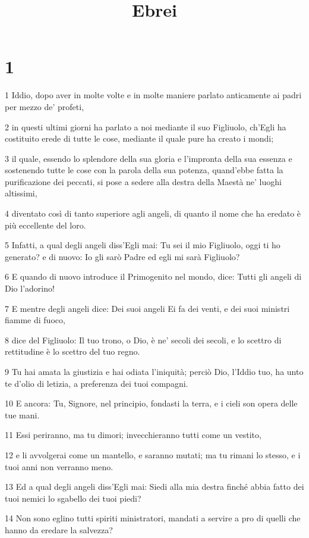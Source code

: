 

\title{Ebrei}


\chapter{1}

\par 1 Iddio, dopo aver in molte volte e in molte maniere parlato anticamente ai padri per mezzo de' profeti,
\par 2 in questi ultimi giorni ha parlato a noi mediante il suo Figliuolo, ch'Egli ha costituito erede di tutte le cose, mediante il quale pure ha creato i mondi;
\par 3 il quale, essendo lo splendore della sua gloria e l'impronta della sua essenza e sostenendo tutte le cose con la parola della sua potenza, quand'ebbe fatta la purificazione dei peccati, si pose a sedere alla destra della Maestà ne' luoghi altissimi,
\par 4 diventato così di tanto superiore agli angeli, di quanto il nome che ha eredato è più eccellente del loro.
\par 5 Infatti, a qual degli angeli diss'Egli mai: Tu sei il mio Figliuolo, oggi ti ho generato? e di nuovo: Io gli sarò Padre ed egli mi sarà Figliuolo?
\par 6 E quando di nuovo introduce il Primogenito nel mondo, dice: Tutti gli angeli di Dio l'adorino!
\par 7 E mentre degli angeli dice: Dei suoi angeli Ei fa dei venti, e dei suoi ministri fiamme di fuoco,
\par 8 dice del Figliuolo: Il tuo trono, o Dio, è ne' secoli dei secoli, e lo scettro di rettitudine è lo scettro del tuo regno.
\par 9 Tu hai amata la giustizia e hai odiata l'iniquità; perciò Dio, l'Iddio tuo, ha unto te d'olio di letizia, a preferenza dei tuoi compagni.
\par 10 E ancora: Tu, Signore, nel principio, fondasti la terra, e i cieli son opera delle tue mani.
\par 11 Essi periranno, ma tu dimori; invecchieranno tutti come un vestito,
\par 12 e li avvolgerai come un mantello, e saranno mutati; ma tu rimani lo stesso, e i tuoi anni non verranno meno.
\par 13 Ed a qual degli angeli diss'Egli mai: Siedi alla mia destra finché abbia fatto dei tuoi nemici lo sgabello dei tuoi piedi?
\par 14 Non sono eglino tutti spiriti ministratori, mandati a servire a pro di quelli che hanno da eredare la salvezza?

